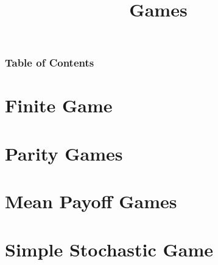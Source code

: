\documentclass{beamer}
\title{Games}
\begin{document}
  \frame{\titlepage}

  \begin{frame}
    \frametitle{Table of Contents}
    \tableofcontents
  \end{frame}

  \section{Finite Game}
    
  \section{Parity Games}
    
  \section{Mean Payoff Games}
    
  \section{Simple Stochastic Game}
    
\end{document}
